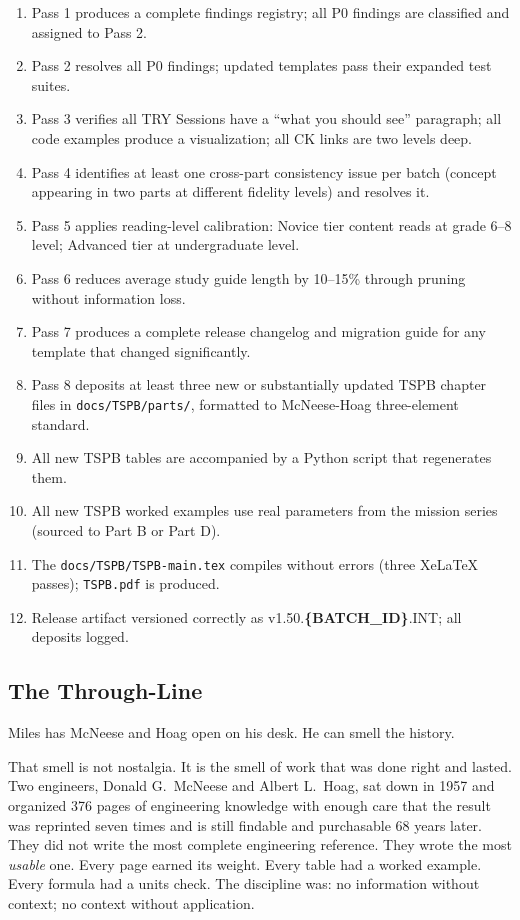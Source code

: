 \documentclass[11pt,letterpaper]{article}
\newcommand{\param}[1]{\textcolor{paramred}{\textbf{\{#1\}}}}
\begin{document}
\begin{enumerate}[leftmargin=*, label=\textbf{SC\arabic*.}]
  \item Pass 1 produces a complete findings registry; all P0 findings are classified and assigned to Pass 2.
  \item Pass 2 resolves all P0 findings; updated templates pass their expanded test suites.
  \item Pass 3 verifies all TRY Sessions have a ``what you should see'' paragraph; all code examples produce a visualization; all CK links are two levels deep.
  \item Pass 4 identifies at least one cross-part consistency issue per batch (concept appearing in two parts at different fidelity levels) and resolves it.
  \item Pass 5 applies reading-level calibration: Novice tier content reads at grade 6--8 level; Advanced tier at undergraduate level.
  \item Pass 6 reduces average study guide length by 10--15\% through pruning without information loss.
  \item Pass 7 produces a complete release changelog and migration guide for any template that changed significantly.
  \item Pass 8 deposits at least three new or substantially updated TSPB chapter files in \texttt{docs/TSPB/parts/}, formatted to McNeese-Hoag three-element standard.
  \item All new TSPB tables are accompanied by a Python script that regenerates them.
  \item All new TSPB worked examples use real parameters from the mission series (sourced to Part B or Part D).
  \item The \texttt{docs/TSPB/TSPB-main.tex} compiles without errors (three XeLaTeX passes); \texttt{TSPB.pdf} is produced.
  \item Release artifact versioned correctly as v1.50.\param{BATCH\_ID}.INT; all deposits logged.
\end{enumerate}

\subsection{The Through-Line}

Miles has McNeese and Hoag open on his desk. He can smell the history. 

That smell is not nostalgia. It is the smell of work that was done right and lasted. Two engineers, Donald G.\ McNeese and Albert L.\ Hoag, sat down in 1957 and organized 376 pages of engineering knowledge with enough care that the result was reprinted seven times and is still findable and purchasable 68 years later. They did not write the most complete engineering reference. They wrote the most \textit{usable} one. Every page earned its weight. Every table had a worked example. Every formula had a units check. The discipline was: no information without context; no context without application.
\end{document}

